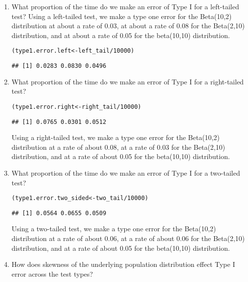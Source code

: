 \documentclass{article}\usepackage[]{graphicx}\usepackage[]{xcolor}
\makeatletter
\newcommand{\hlnum}[1]{\textcolor[rgb]{0.686,0.059,0.569}{#1}}%
\newcommand{\hlopt}[1]{\textcolor[rgb]{0,0,0}{#1}}%
\newcommand{\hldef}[1]{\textcolor[rgb]{0.345,0.345,0.345}{#1}}%
\newcommand{\hlkwb}[1]{\textcolor[rgb]{0.69,0.353,0.396}{#1}}%
\newenvironment{kframe}{%
 \def\at@end@of@kframe{}%
 \ifinner\ifhmode%
  \def\at@end@of@kframe{\end{minipage}}%
  \begin{minipage}{\columnwidth}%
 \fi\fi%
 \def\FrameCommand##1{\hskip\@totalleftmargin \hskip-\fboxsep
 \colorbox{shadecolor}{##1}\hskip-\fboxsep
     \hskip-\linewidth \hskip-\@totalleftmargin \hskip\columnwidth}%
 \MakeFramed {\advance\hsize-\width
   \@totalleftmargin\z@ \linewidth\hsize
   \@setminipage}}%
 {\par\unskip\endMakeFramed%
 \at@end@of@kframe}
\newenvironment{knitrout}{}{} %
\makeatother
\begin{document}
\begin{enumerate}
  \begin{enumerate}
    \item What proportion of the time do we make an error of Type I for a
    left-tailed test?
Using a left-tailed test, we make a type one error for the Beta(10,2) distribution at about a rate of 0.03, at about a rate of 0.08 for the Beta(2,10) distribution, and at about a rate of 0.05 for the beta(10,10) distribution.
\begin{knitrout}
\color{fgcolor}\begin{kframe}
\begin{alltt}
\hldef{(type1.error.left} \hlkwb{<-} \hldef{left_tail}\hlopt{/}\hlnum{10000}\hldef{)}
\end{alltt}
\begin{verbatim}
## [1] 0.0283 0.0830 0.0496
\end{verbatim}
\end{kframe}
\end{knitrout}
    \item What proportion of the time do we make an error of Type I for a
    right-tailed test?
\begin{knitrout}
\color{fgcolor}\begin{kframe}
\begin{alltt}
\hldef{(type1.error.right} \hlkwb{<-} \hldef{right_tail}\hlopt{/}\hlnum{10000}\hldef{)}
\end{alltt}
\begin{verbatim}
## [1] 0.0765 0.0301 0.0512
\end{verbatim}
\end{kframe}
\end{knitrout}
Using a right-tailed test, we make a type one error for the Beta(10,2) distribution at a rate of about 0.08, at a rate of 0.03 for the Beta(2,10) distribution, and at a rate of about 0.05 for the beta(10,10) distribution.
    \item What proportion of the time do we make an error of Type I for a
    two-tailed test?
\begin{knitrout}
\color{fgcolor}\begin{kframe}
\begin{alltt}
\hldef{(type1.error.two_sided} \hlkwb{<-} \hldef{two_tail}\hlopt{/}\hlnum{10000}\hldef{)}
\end{alltt}
\begin{verbatim}
## [1] 0.0564 0.0655 0.0509
\end{verbatim}
\end{kframe}
\end{knitrout}
Using a two-tailed test, we make a type one error for the Beta(10,2) distribution at a rate of about 0.06, at a rate of about 0.06 for the Beta(2,10) distribution, and at a rate of about 0.05 for the beta(10,10) distribution.
    \item How does skewness of the underlying population distribution effect
    Type I error across the test types?


\end{enumerate}
\end{enumerate}
\end{document}
